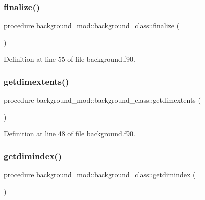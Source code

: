 \subsubsection{\texorpdfstring{finalize()}{finalize()}}
{\footnotesize\ttfamily procedure background\+\_\+mod\+::background\+\_\+class\+::finalize (\begin{DoxyParamCaption}{ }\end{DoxyParamCaption})\hspace{0.3cm}{\ttfamily [private]}}



Definition at line 55 of file background.\+f90.

\mbox{\label{structbackground__mod_1_1background__class_adecdce1f527c3ccb5f57d8b267023f4f}} 
\subsubsection{\texorpdfstring{getdimextents()}{getdimextents()}}
{\footnotesize\ttfamily procedure background\+\_\+mod\+::background\+\_\+class\+::getdimextents (\begin{DoxyParamCaption}{ }\end{DoxyParamCaption})\hspace{0.3cm}{\ttfamily [private]}}



Definition at line 48 of file background.\+f90.

\mbox{\label{structbackground__mod_1_1background__class_a91992b0ccc0956daecda2f250ba934d6}} 
\subsubsection{\texorpdfstring{getdimindex()}{getdimindex()}}
{\footnotesize\ttfamily procedure background\+\_\+mod\+::background\+\_\+class\+::getdimindex (\begin{DoxyParamCaption}{ }\end{DoxyParamCaption})\hspace{0.3cm}{\ttfamily [private]}}




